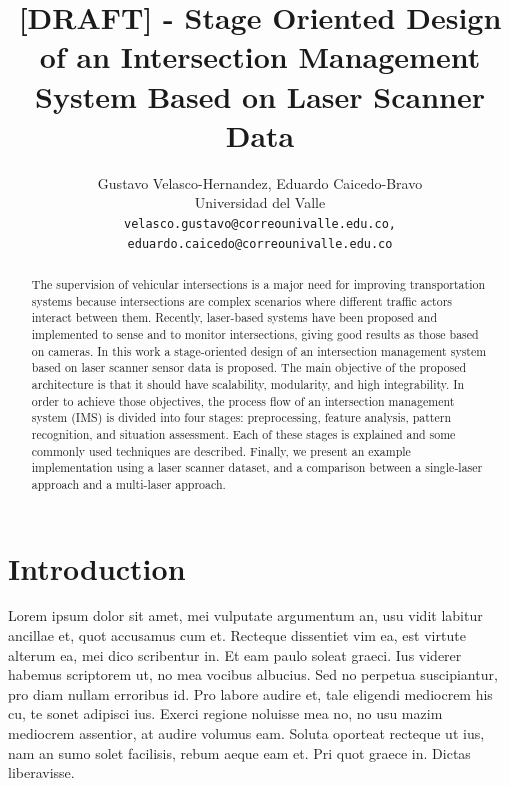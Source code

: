 \documentclass[10pt,twocolumn,letterpaper]{article}
\begin{document}
\title{[DRAFT] - Stage Oriented Design of an Intersection Management System Based on Laser Scanner Data}

\author{Gustavo Velasco-Hernandez, Eduardo Caicedo-Bravo \\
Universidad del Valle\\
{\tt\small velasco.gustavo@correounivalle.edu.co, eduardo.caicedo@correounivalle.edu.co}
}

\maketitle

\begin{abstract}
The supervision of vehicular intersections is a major need for improving transportation systems because intersections are complex scenarios where different traffic actors interact between them. Recently, laser-based systems have been proposed and implemented to sense and to monitor intersections, giving good results as those based on cameras. In this work a stage-oriented design of an intersection management system based on laser scanner sensor data is proposed. The main objective of the proposed architecture is that it should have scalability, modularity, and high integrability. In order to achieve those objectives, the process flow of an intersection management system (IMS) is divided into four stages: preprocessing, feature analysis, pattern recognition, and situation assessment. Each of these stages is explained and some commonly used techniques are described. Finally, we present an example implementation using a laser scanner dataset, and a comparison between a single-laser approach and a multi-laser approach.


\end{abstract}
 

\section{Introduction}
Lorem ipsum dolor sit amet, mei vulputate argumentum an, usu vidit labitur ancillae et, quot accusamus cum et. Recteque dissentiet vim ea, est virtute alterum ea, mei dico scribentur in. Et eam paulo soleat graeci. Ius viderer habemus scriptorem ut, no mea vocibus albucius. Sed no perpetua suscipiantur, pro diam nullam erroribus id. Pro labore audire et, tale eligendi mediocrem his cu, te sonet adipisci ius. Exerci regione noluisse mea no, no usu mazim mediocrem assentior, at audire volumus eam. Soluta oporteat recteque ut ius, nam an sumo solet facilisis, rebum aeque eam et. Pri quot graece in. Dictas liberavisse.
\end{document}
